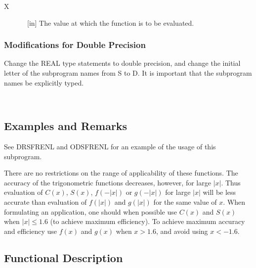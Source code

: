 \documentclass[twoside]{MATH77}
\begin{document}
\begin{description}
\item[X]  \ [in] The value at which the function is to be evaluated.
\end{description}

\subsubsection{Modifications for Double Precision}

Change the REAL type statements to double precision, and change the initial
letter of the subprogram names from S to D. It is important that the
subprogram names be explicitly typed.
\vspace{10pt}

\hspace{5pt}\mbox{ }

\subsection{Examples and Remarks}

See DRSFRENL and ODSFRENL for an example of the usage of this subprogram.

There are no restrictions on the range of applicability of these functions.
The accuracy of the trigonometric functions decreases, however, for large $%
|x|$. Thus evaluation of $C(x)$, $S(x)$, $f(-|x|)$ or $g(-|x|)$ for large $%
|x|$ will be less accurate than evaluation of $f(|x|)$ and $g(|x|)$ for the
same value of $x$. When formulating an application, one should when possible
use $C(x)$ and $S(x)$ when $|x|\leq 1.6$ (to achieve maximum efficiency). To
achieve maximum accuracy and efficiency use $f(x)$ and $g(x)$ when $x>1.6$,
and avoid using $x<-1.6.$

\subsection{Functional Description}
\end{document}
